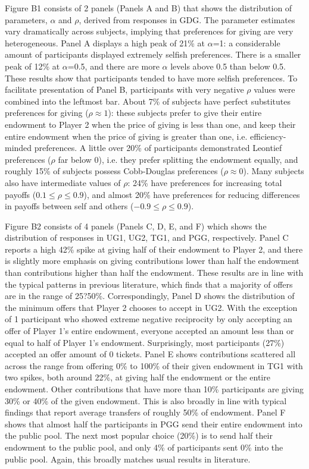 \documentclass[12pt]{article}
\begin{document}
Figure B1 consists of 2 panels (Panels A and B) that shows the distribution of parameters, \(\alpha\) and \(\rho\), derived from responses in GDG.  The parameter estimates vary dramatically across subjects, implying that preferences for giving are very heterogeneous. Panel A displays a high peak of 21\% at \(\alpha\)=1: a considerable amount of participants displayed extremely selfish preferences. There is a smaller peak of 12\% at \(\alpha\)=0.5, and there are more \(\alpha\) levels above 0.5 than below 0.5. These results show that participants tended to have more selfish preferences. To facilitate presentation of Panel B, participants with very negative \(\rho\) values were combined into the leftmost bar. About 7\% of subjects have perfect substitutes preferences for giving (\(\rho \approx 1\)): these subjects prefer to give their entire endowment to Player 2 when the price of giving is less than one, and keep their entire endowment when the price of giving is greater than one, i.e. efficiency-minded preferences. A little over 20\% of participants demonstrated Leontief preferences (\(\rho\) far below 0), i.e. they prefer splitting the endowment equally, and roughly 15\% of subjects possess Cobb-Douglas preferences (\(\rho \approx 0\)). Many subjects also have intermediate values of \(\rho\): 24\% have preferences for increasing total payoffs (\(0.1 \leq \rho \leq 0.9\)), and almost 20\% have preferences for reducing differences in payoffs between self and others (\(-0.9 \leq \rho \leq 0.9\)).


Figure B2 consists of 4 panels (Panels C, D, E, and F) which shows the distribution of responses in UG1, UG2, TG1, and PGG, respectively. Panel C reports a high 42\% spike at giving half of their endowment to Player 2, and there is slightly more emphasis on giving contributions lower than half the endowment than contributions higher than half the endowment. These results are in line with the typical patterns in previous literature, which finds that a majority of offers are in the range of 25?50\%. Correspondingly, Panel D shows the distribution of the minimum offers that Player 2 chooses to accept in UG2. With the exception of 1 participant who showed extreme negative reciprocity by only accepting an offer of Player 1's entire endowment, everyone accepted an amount less than or equal to half of Player 1's endowment. Surprisingly, most participants (27\%) accepted an offer amount of 0 tickets. Panel E shows contributions scattered all across the range from offering 0\% to 100\% of their given endowment in TG1 with two spikes, both around 22\%, at giving half the endowment or the entire endowment. Other contributions that have more than 10\% participants are giving 30\% or 40\% of the given endowment. This is also broadly in line with typical findings that report average transfers of roughly 50\% of endowment. Panel F shows that almost half the participants in PGG send their entire endowment into the public pool. The next most popular choice (20\%) is to send half their endowment to the public pool, and only 4\% of participants sent 0\% into the public pool. Again, this broadly matches usual results in literature.
\end{document}
